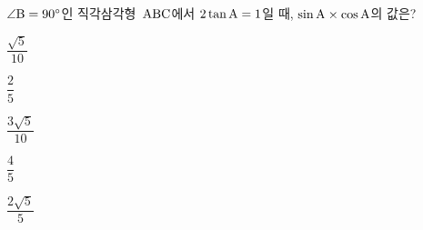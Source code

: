 $\angle\mathrm{B}=90^\circ$인 직각삼각형~$\mathrm{ABC}$에서 $2\tan\mathrm{A}=1$일 때, $\sin\mathrm{A}\times\cos\mathrm{A}$의 값은?
\begin{choices32}{\rule[-3ex]{0pt}{8ex}$\dfrac{\sqrt{5}}{10}$}{\rule[-3ex]{0pt}{8ex}$\dfrac{2}{5}$}{\rule[-3ex]{0pt}{8ex}$\dfrac{3\sqrt{5}}{10}$}{\rule[-3ex]{0pt}{8ex}$\dfrac{4}{5}$}{\rule[-3ex]{0pt}{8ex}$\dfrac{2\sqrt{5}}{5}$}\end{choices32}
